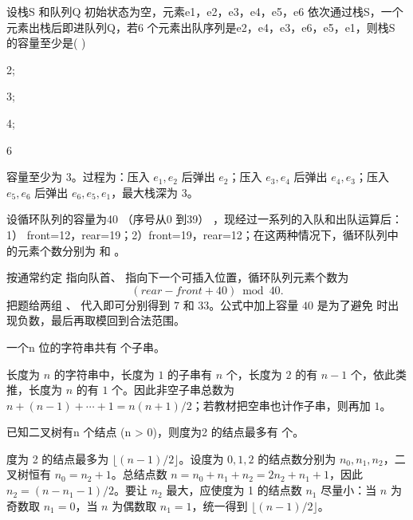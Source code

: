 \begin{question}
设栈S 和队列Q 初始状态为空，元素e1，e2，e3，e4，e5，e6 依次通过栈S，一个元素出栈后即进队列Q，若6 个元素出队序列是e2，e4，e3，e6，e5，e1，则栈S 的容量至少是(       )\\
\begin{choiceoptions}
  \item 2;
  \item 3;
  \item 4;
  \item 6
\end{choiceoptions}
\begin{solution}
容量至少为 3。过程为：压入 $e_1,e_2$ 后弹出 $e_2$；压入 $e_3,e_4$ 后弹出 $e_4,e_3$；压入 $e_5,e_6$ 后弹出 $e_6,e_5,e_1$，最大栈深为 3。
\end{solution}
\end{question}

\begin{question}
设循环队列的容量为40 （序号从0 到39） ，现经过一系列的入队和出队运算后： 1） front=12，rear=19；2）front=19，rear=12；在这两种情况下，循环队列中的元素个数分别为 \blank 和 \blank 。\\
\begin{solution}
按通常约定 \texttt{} 指向队首、\texttt{} 指向下一个可插入位置，循环队列元素个数为
\[
(rear-front+40)\bmod40.
\]
把题给两组 \texttt{}、\texttt{} 代入即可分别得到 $7$ 和 $33$。公式中加上容量 $40$ 是为了避免 \texttt{} 时出现负数，最后再取模回到合法范围。
\end{solution}
\end{question}

\begin{question}
一个n 位的字符串共有 \blank 个子串。\\
\begin{solution}
长度为 $n$ 的字符串中，长度为 $1$ 的子串有 $n$ 个，长度为 $2$ 的有 $n-1$ 个，依此类推，长度为 $n$ 的有 $1$ 个。因此非空子串总数为 $n+(n-1)+\cdots+1=n(n+1)/2$；若教材把空串也计作子串，则再加 $1$。
\end{solution}
\end{question}

\begin{question}
已知二叉树有n 个结点 (n > 0)，则度为2 的结点最多有 \blank 个。\\
\begin{solution}
度为 2 的结点最多为 $\lfloor(n-1)/2\rfloor$。设度为 $0,1,2$ 的结点数分别为 $n_0,n_1,n_2$，二叉树恒有 $n_0=n_2+1$。总结点数 $n=n_0+n_1+n_2=2n_2+n_1+1$，因此 $n_2=(n-n_1-1)/2$。要让 $n_2$ 最大，应使度为 1 的结点数 $n_1$ 尽量小：当 $n$ 为奇数取 $n_1=0$，当 $n$ 为偶数取 $n_1=1$，统一得到 $\lfloor(n-1)/2\rfloor$。
\end{solution}
\end{question}

